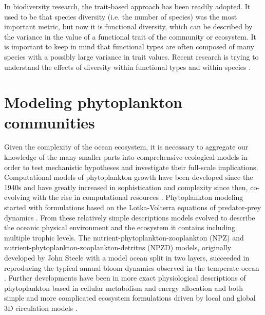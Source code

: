 In biodiversity research, the trait-based approach has been readily adopted. It used to be that species diversity (i.e. the number of species) was the most important metric, but now it is functional diversity, which can be described by the variance in the value of a functional trait of the community or ecosystem. It is important to keep in mind that functional types are often composed of many species with a possibly large variance in trait values. Recent research is trying to understand the effects of diversity within functional types and within species \citep{Violle2012,Violle2017a,DesRoches2018}.




\section{Modeling phytoplankton communities}
Given the complexity of the ocean ecosystem, it is necessary to aggregate our knowledge of the many smaller parts into comprehensive ecological models in order to test mechanistic hypotheses
 and investigate their full-scale implications. Computational models of phytoplankton growth have been developed since the 1940s and have greatly increased in sophistication and complexity since then, co-evolving with the rise in computational resources \citep{Gentleman2002a}. 
 Phytoplankton modeling started with formulations based on the Lotka-Volterra equations of predator-prey dynamics \citep{Fleming1939}. From these relatively simple descriptions models evolved to describe the oceanic physical environment and the ecosystem it contains including multiple trophic levels. 
 The nutrient-phytoplankton-zooplankton (NPZ) and nutrient-phytoplankton-zooplankton-detritus (NPZD) models, originally developed by John Steele with a model ocean split in two layers, succeeded in reproducing the typical annual bloom dynamics observed in the temperate ocean \citep{Steele1958,Evans1988,Fasham1990a}. Further developments have been in more exact physiological descriptions of phytoplankton based in cellular metabolism and energy allocation \citep{Geider1997} and both simple and more complicated ecosystem formulations driven by local and global 3D circulation models \citep{Lacroix2007, Hirata2013}.

